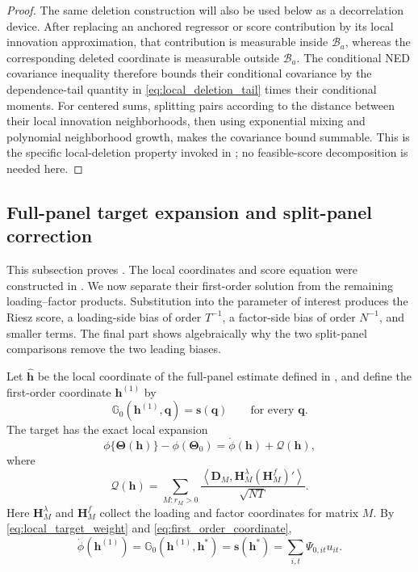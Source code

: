 \documentclass[11pt]{article}
\numberwithin{equation}{section}
\theoremstyle{remark}
\newcommand{\ip}[2]{\left\langle #1,#2\right\rangle}
\newcommand{\bD}{\bm D}
\newcommand{\bTheta}{\bm\Theta}
\begin{document}
\begin{proof}
The same deletion construction will also be used below as a decorrelation device. After replacing an anchored regressor or score contribution by its local innovation approximation, that contribution is measurable inside $\mathcal B_a$, whereas the corresponding deleted coordinate is measurable outside $\mathcal B_a$. The conditional NED covariance inequality therefore bounds their conditional covariance by the dependence-tail quantity in \eqref{eq:local_deletion_tail} times their conditional moments. For centered sums, splitting pairs according to the distance between their local innovation neighborhoods, then using exponential mixing and polynomial neighborhood growth, makes the covariance bound summable. This is the specific local-deletion property invoked in ; no feasible-score decomposition is needed here.
\end{proof}

\subsection{Full-panel target expansion and split-panel correction}
\label{app:bias}

This subsection proves . The local coordinates and score equation were constructed in . We now separate their first-order solution from the remaining loading--factor products. Substitution into the parameter of interest produces the Riesz score, a loading-side bias of order $T^{-1}$, a factor-side bias of order $N^{-1}$, and smaller terms. The final part shows algebraically why the two split-panel comparisons remove the two leading biases.

Let $\widehat{\bm h}$ be the local coordinate of the full-panel estimate defined in , and define the first-order coordinate $\bm h^{(1)}$ by
\begin{equation}
\label{eq:first_order_coordinate}
\mathbb G_0(\bm h^{(1)},\bm q)
=
\bm s(\bm q)
\qquad
\text{for every }\bm q.
\end{equation}
The target has the exact local expansion
\begin{equation}
\label{eq:local_target_expansion}
\phi\{\bTheta(\bm h)\}
-
\phi(\bTheta_0)
=
\dot\phi(\bm h)
+
\mathcal Q(\bm h),
\end{equation}
where
\begin{equation}
\label{eq:target_quadratic}
\mathcal Q(\bm h)
=
\sum_{M:r_M>0}
\frac{
\ip{\bD_M}{\bm H_M^\lambda(\bm H_M^f)'}
}{
\sqrt{NT}
}.
\end{equation}
Here $\bm H_M^\lambda$ and $\bm H_M^f$ collect the loading and factor coordinates for matrix $M$. By \eqref{eq:local_target_weight} and \eqref{eq:first_order_coordinate},
\begin{equation}
\label{eq:first_order_influence_identity}
\dot\phi(\bm h^{(1)})
=
\mathbb G_0(\bm h^{(1)},\bm h^*)
=
\bm s(\bm h^*)
=
\sum_{i,t}\Psi_{0,it}u_{it}.
\end{equation}
\end{document}
